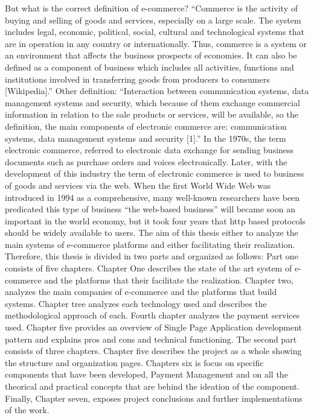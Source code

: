 But what is the correct definition of e-commerce?
“Commerce is the activity of buying and selling of goods and services, especially on a large scale. The system includes legal, economic, political, social, cultural and technological systems that are in operation in any country or internationally. Thus, commerce is a system or an environment that affects the business prospects of economies. It can also be defined as a component of business which includes all activities, functions and institutions involved in transferring goods from producers to consumers [Wikipedia].”
\newline
Other definition:
“Interaction between communication systems, data management systems and security, which because of them exchange commercial information in relation to the sale products or services, will be available, so the definition, the main components of electronic commerce are: communication systems, data management systems and security [1].”
\newline
In the 1970s, the term electronic commerce, referred to electronic data exchange for sending business documents such as purchase orders and voices electronically. Later, with the development of this industry the term of electronic commerce is used to business of goods and services via the web. When the first World Wide Web was introduced in 1994 as a comprehensive, many well-known researchers have been predicated this type of business “the web-based business” will became soon an important in the world economy, but it took four years that http based protocols should be widely available to users.
The aim of this thesis either to analyze the main systems of e-commerce platforms and either facilitating their realization.
 \newline
Therefore, this thesis is divided in two parts and organized as follows:
Part one consists of five chapters. Chapter One describes the state of the art system of e-commerce and the platforms that their facilitate the realization. Chapter two, analyzes the main companies of e-commerce and the platforms that build systems. Chapter tree analyzes each technology used and describes the methodological approach of each. Fourth chapter analyzes the payment services used. Chapter five provides an overview of Single Page Application development pattern and explains pros and cons and technical functioning.
The second part consists of three chapters. Chapter five describes the project as a whole showing the structure and organization pages. Chapters six is focus on specific components that have been developed, Payment Management and on all the theorical and practical concepts that are behind the ideation of the component. Finally, Chapter seven, exposes project conclusions and further implementations of the work.
